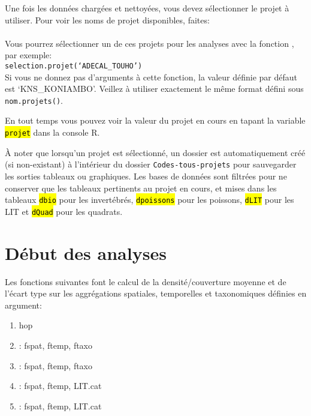\documentclass{article}
\begin{document}
Une fois les données chargées et nettoyées, vous devez sélectionner le
projet à utiliser. Pour voir les noms de projet disponibles, faites:\\

 \\

Vous pourrez sélectionner un de ces projets pour les analyses avec la
fonction , par exemple:\\

\texttt{selection.projet(`ADECAL\_TOUHO')}\\

Si vous ne donnez pas d'arguments à cette fonction, la valeur définie
par défaut est `KNS\_KONIAMBO'. Veillez à utiliser exactement le même
format défini sous \texttt{nom.projets()}.

En tout temps vous pouvez voir la valeur du projet en cours en tapant
la variable \hl{\texttt{projet}} dans la console R.

À noter que lorsqu'un projet est sélectionné, un dossier est
automatiquement créé (si non-existant) à l'intérieur du dossier
\texttt{Codes-tous-projets} pour sauvegarder les sorties tableaux ou
graphiques. Les bases de données sont filtrées pour ne conserver que
les tableaux pertinents au projet en cours, et mises dans les tableaux
\hl{\texttt{dbio}} pour les invertébrés, \hl{\texttt{dpoissons}} pour les
poissons, \hl{\texttt{dLIT}} pour les LIT et \hl{\texttt{dQuad}} pour les quadrats.

\section{Début des analyses}

Les fonctions suivantes font le calcul de la densité/couverture
moyenne et de l'écart type sur les aggrégations spatiales, temporelles
et taxonomiques définies en argument:
\begin{enumerate}
\item hop
\item {}: fspat, ftemp, ftaxo
\item {}: fspat, ftemp, ftaxo
\item {}: fspat, ftemp, LIT.cat
\item {}: fspat, ftemp, LIT.cat
\end{enumerate}
\end{document}
